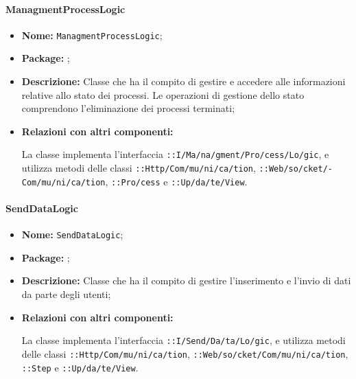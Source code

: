 \paragraph{ManagmentProcessLogic}
\begin{flushleft}
\begin{itemize}
\item \textbf{Nome:} \texttt{ManagmentProcessLogic};
\item \textbf{Package:} \texttt{\logicUser{}};
\item \textbf{Descrizione:} Classe che ha il compito di gestire e accedere alle informazioni relative allo stato dei processi. Le operazioni di gestione dello stato comprendono l'eliminazione dei processi terminati;
\item \textbf{Relazioni con altri componenti:}
\begin{sloppypar}
La classe implementa l'interfaccia \texttt{\iLogicUser{}::I\fshyp{}Ma\fshyp{}na\fshyp{}gment\fshyp{}Pro\fshyp{}cess\fshyp{}Lo\fshyp{}gic}, e utilizza metodi delle classi \texttt{\serverCommunication{}::Http\fshyp{}Com\fshyp{}mu\fshyp{}ni\fshyp{}ca\fshyp{}tion}, \texttt{\serverCommunication{}::Web\fshyp{}so\fshyp{}cket\fshyp{}Com\fshyp{}mu\fshyp{}ni\fshyp{}ca\fshyp{}tion}, \texttt{\modelUser{}::Pro\fshyp{}cess} e \texttt{\logicUser{}::Up\fshyp{}da\fshyp{}te\fshyp{}View}.
\end{sloppypar}
\end{itemize}
\end{flushleft}

\paragraph{SendDataLogic}
\begin{flushleft}
\begin{itemize}
\item \textbf{Nome:} \texttt{SendDataLogic};
\item \textbf{Package:} \texttt{\logicUser{}};
\item \textbf{Descrizione:} Classe che ha il compito di gestire l'inserimento e l'invio di dati da parte degli utenti;
\item \textbf{Relazioni con altri componenti:}
\begin{sloppypar}
La classe implementa l'interfaccia \texttt{\iLogicUser{}::I\fshyp{}Send\fshyp{}Da\fshyp{}ta\fshyp{}Lo\fshyp{}gic}, e utilizza metodi delle classi \texttt{\serverCommunication{}::Http\fshyp{}Com\fshyp{}mu\fshyp{}ni\fshyp{}ca\fshyp{}tion}, \texttt{\serverCommunication{}::Web\fshyp{}so\fshyp{}cket\fshyp{}Com\fshyp{}mu\fshyp{}ni\fshyp{}ca\fshyp{}tion}, \texttt{\model{}::Step} e \texttt{\logicUser{}::Up\fshyp{}da\fshyp{}te\fshyp{}View}.
\end{sloppypar}
\end{itemize}
\end{flushleft}

